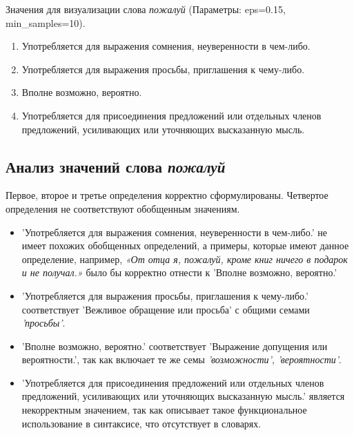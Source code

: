 Значения для визуализации слова \textit{пожалуй} (Параметры: eps=0.15, min\_samples=10).

\begin{enumerate}
    \item Употребляется для выражения сомнения, неуверенности в чем-либо.
    \item Употребляется для выражения просьбы, приглашения к чему-либо.
    \item Вполне возможно, вероятно.
    \item Употребляется для присоединения предложений или отдельных членов предложений,
усиливающих или уточняющих высказанную мысль.
\end{enumerate}

\subsection*{Анализ значений слова \textit{пожалуй}}

Первое, второе и третье определения корректно сформулированы.
Четвертое определения не соответствуют обобщенным значениям.

\begin{itemize}
    \item ’Употребляется для выражения сомнения, неуверенности в чем-либо.’
не имеет похожих обобщенных определений, а примеры, которые имеют данное определение,
например, \textit{«От отца я, пожалуй, кроме книг ничего в подарок и не получал.»}
было бы корректно отнести к ’Вполне возможно, вероятно.’

    \item ’Употребляется для выражения просьбы, приглашения к чему-либо.’ соответствует
’Вежливое обращение или просьба’ с общими семами \textit{’просьбы’}.

    \item ’Вполне возможно, вероятно.’ соответствует
’Выражение допущения или вероятности.’, так как включает те же семы \textit{’возможности’}, \textit{’вероятности’}.
\end{itemize}

\begin{itemize}
    \item ’Употребляется для присоединения предложений или отдельных членов предложений,
усиливающих или уточняющих высказанную мысль.’ является некорректным значением,
так как описывает такое функциональное использование в синтаксисе, что отсутствует в словарях.
\end{itemize}

